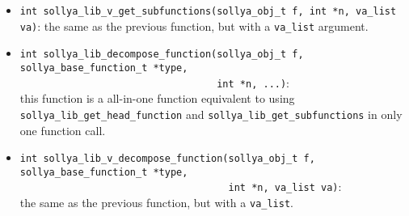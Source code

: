 \documentclass[a4paper]{article}
\newcommand{\sollya}{\texttt{Sollya}\xspace}
\begin{document}
\begin{itemize}
  \begin{itemize}
  \item If $f_0$ is a library function, a \sollya object corresponding to the expression $f_0(x)$ is stored at the address referred to by \texttt{g\_t}. This allows the user to get a \sollya object corresponding to function $f_0$. This object can further be used to evaluate $f_0$ at points or to build new expressions involving $f_0$. Please notice that a library function object is not necessarily the result of a call to the \verb|library| command: it can also be, e.g., the derivative of a function created by a call to \verb|library|.
  \item If $f_0$ is a procedure function, a \sollya object corresponding to the expression $f_0(x)$ is stored at the address referred to by \texttt{g\_t}. The same remarks as above apply.
  \item If $f_0$ is a constant or a library constant, $f_0$ itself is stored at the address referred to by \texttt{g\_t}. In this particular case, $t=1$ and the object referred to by \texttt{g\_t} simply gets a copy of \texttt{f}. This (somehow useless) mechanism is made only to handle the cases of library functions, procedure functions, constants and library constants in a unified way.
  \end{itemize}
Please note that the objects that have been stored in variables \texttt{g\_i} must manually be cleared once they become useless.

\item \verb|int sollya_lib_v_get_subfunctions(sollya_obj_t f, int *n, va_list va)|: the same as the previous function, but with a \texttt{va\_list} argument.
\item \verb|int sollya_lib_decompose_function(sollya_obj_t f, sollya_base_function_t *type,|\\
      \verb|                                  int *n, ...)|:\\
this function is a all-in-one function equivalent to using \verb|sollya_lib_get_head_function| and \verb|sollya_lib_get_subfunctions| in only one function call.
\item \verb|int sollya_lib_v_decompose_function(sollya_obj_t f, sollya_base_function_t *type,|\\
      \verb|                                    int *n, va_list va)|:\\
the same as the previous function, but with a \texttt{va\_list}.
\end{itemize}
\end{document}
